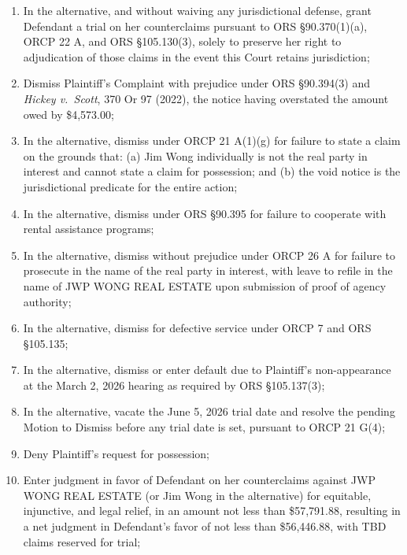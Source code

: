 \documentclass[12pt,letterpaper]{article}
\begin{document}
\begin{enumerate}
  \item In the alternative, and without waiving any jurisdictional defense, grant Defendant a trial on her counterclaims pursuant to ORS \S90.370(1)(a), ORCP 22 A, and ORS \S105.130(3), solely to preserve her right to adjudication of those claims in the event this Court retains jurisdiction;

  \item Dismiss Plaintiff's Complaint with prejudice under ORS \S90.394(3) and \textit{Hickey v.\ Scott}, 370 Or 97 (2022), the notice having overstated the amount owed by \$4,573.00;

  \item In the alternative, dismiss under ORCP 21 A(1)(g) for failure to state a claim on the grounds that: (a) Jim Wong individually is not the real party in interest and cannot state a claim for possession; and (b) the void notice is the jurisdictional predicate for the entire action;

  \item In the alternative, dismiss under ORS \S90.395 for failure to cooperate with rental assistance programs;

  \item In the alternative, dismiss without prejudice under ORCP 26 A for failure to prosecute in the name of the real party in interest, with leave to refile in the name of JWP WONG REAL ESTATE upon submission of proof of agency authority;

  \item In the alternative, dismiss for defective service under ORCP 7 and ORS \S105.135;

  \item In the alternative, dismiss or enter default due to Plaintiff's non-appearance at the March 2, 2026 hearing as required by ORS \S105.137(3);

  \item In the alternative, vacate the June 5, 2026 trial date and resolve the pending Motion to Dismiss before any trial date is set, pursuant to ORCP 21 G(4);

  \item Deny Plaintiff's request for possession;

  \item Enter judgment in favor of Defendant on her counterclaims against JWP WONG REAL ESTATE (or Jim Wong in the alternative) for equitable, injunctive, and legal relief, in an amount not less than \$57,791.88, resulting in a net judgment in Defendant's favor of not less than \$56,446.88, with TBD claims reserved for trial;


\end{enumerate}
\end{document}
